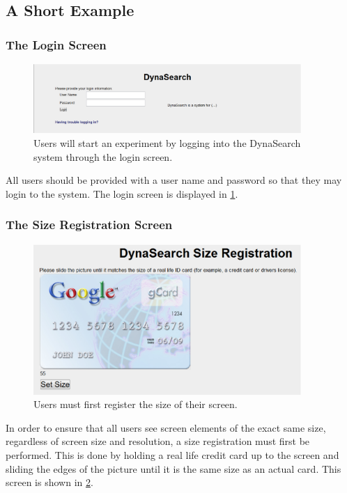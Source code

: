 \documentclass[article]{ij4uq}              %
\begin{document}
\subsection{A Short Example}

\subsubsection{The Login Screen}

\begin{figure}[h!]
 \centering
 \includegraphics[width=4.0in]{figures/login.eps}
 \caption{Users will start an experiment by logging into the DynaSearch system through the login screen.}
 \label{fig:login}
\end{figure}
\FloatBarrier

All users should be provided with a user name and password so that they may login to the system. The login screen is displayed in \ref{fig:login}.

\subsubsection{The Size Registration Screen}

\begin{figure}[h!]
 \centering
 \includegraphics[width=4.0in]{figures/size_reg.eps}
 \caption{Users must first register the size of their screen.}
 \label{fig:sizereg}
\end{figure}
\FloatBarrier


In order to ensure that all users see screen elements of the exact same size, regardless of screen size and resolution, a size registration must first be performed. This is done by holding a real life credit card up to the screen and sliding the edges of the picture until it is the same size as an actual card. This screen is shown in \ref{fig:sizereg}.
\end{document}
